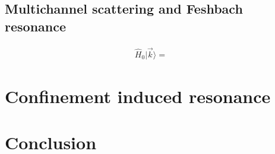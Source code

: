 \documentclass[aps,twocolumn,secnumarabic,balancelastpage,amsmath,amssymb,nofootinbib]{revtex4}
\newcommand{\eqar}[1]
{
  \begin{align*}
    #1
  \end{align*}
}
\begin{document}
\subsection{Multichannel scattering and Feshbach resonance}
\eqar{
  \hat H_0|\vec k\rangle=&
}



\section{Confinement induced resonance}





\section{Conclusion}


\end{document}
